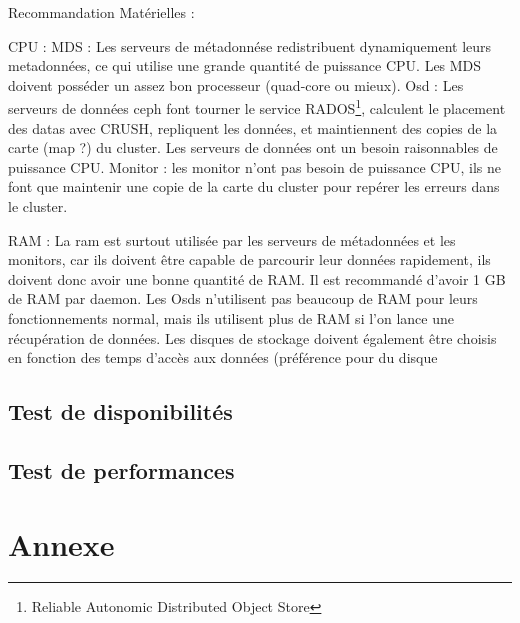\documentclass{article}
\begin{document}
	Recommandation Matérielles : 
	
	CPU :
	MDS : Les serveurs de métadonnése redistribuent dynamiquement leurs metadonnées, ce qui utilise une grande quantité de puissance CPU. Les MDS doivent posséder un assez bon processeur (quad-core ou mieux).
	Osd : Les serveurs de données ceph font tourner le service RADOS\footnote{ Reliable Autonomic Distributed Object Store}, calculent le placement des datas avec CRUSH, repliquent les données, et maintiennent des copies de la carte (map ?) du cluster. Les serveurs de données ont un besoin raisonnables de puissance CPU.
	Monitor : les monitor n'ont pas besoin de puissance CPU, ils ne font que maintenir une copie de la carte du cluster pour repérer les erreurs dans le cluster.
	
	RAM :
	La ram est surtout utilisée par les serveurs de métadonnées et les monitors, car ils doivent être capable de parcourir leur données rapidement, ils doivent donc avoir une bonne quantité de RAM. Il est recommandé d'avoir 1 GB de RAM par daemon.
	Les Osds n'utilisent pas beaucoup de RAM pour leurs fonctionnements normal, mais ils utilisent plus de RAM si l'on lance une récupération de données.
	Les disques de stockage doivent également être choisis en fonction des temps d'accès aux données (préférence pour du disque
	
	\subsection{Test de disponibilités}
	\subsection{Test de performances}
	
	
  \section{Annexe}
 
\end{document}
